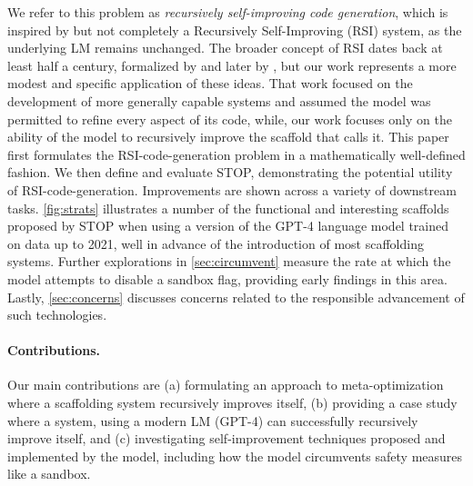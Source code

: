\documentclass{article}
\begin{document}
We refer to this problem as \textit{recursively self-improving code generation}, which is inspired by but not completely a Recursively Self-Improving (RSI) system, as the underlying LM remains unchanged. 
The broader concept of RSI dates back at least half a century, formalized by \citet{good1966speculations} and later by \citet{schmidhuber2003godel}, but our work represents a more modest and specific application of these ideas. That work focused on the development of more generally capable systems and assumed the model was permitted to refine every aspect of its code, while, our work focuses only on the ability of the model to recursively improve the scaffold that calls it. This paper first formulates the RSI-code-generation problem in a mathematically well-defined fashion. We then define and evaluate STOP, demonstrating the potential utility of RSI-code-generation. Improvements are shown across a variety of downstream tasks. \cref{fig:strats} illustrates a number of the functional and interesting scaffolds proposed by STOP when using a version of the GPT-4 language model \citep{openai_gpt-4_2023} trained on data up to 2021, well in advance of the introduction of most scaffolding systems. Further explorations in \cref{sec:circumvent} measure the rate at which the model attempts to disable a sandbox flag, providing early findings in this area.  
Lastly, \cref{sec:concerns} discusses concerns related to the responsible advancement of such technologies.


















\paragraph{Contributions.} Our main contributions are (a) formulating an approach to meta-optimization where a scaffolding system recursively improves itself, (b) providing a case study where a system, using a modern LM (GPT-4) can successfully recursively improve itself, and (c) investigating self-improvement techniques proposed and implemented by the model, including how the model circumvents safety measures like a sandbox.
\end{document}
